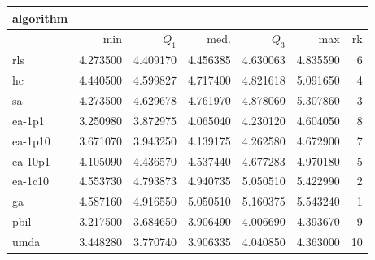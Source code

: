 \begin{tabular}{@{}l*{5}{>{{}}N{1}{2}}>{{}}N{2}{0}@{}}
\toprule
{algorithm} &  \\
\midrule
& {min} & {$Q_1$} & {med.} & {$Q_3$} & {max} & {rk}\\
\midrule
rls & 4.273500 & 4.409170 & 4.456385 & 4.630063 & 4.835590 & 6\\
hc & 4.440500 & 4.599827 & 4.717400 & 4.821618 & 5.091650 & 4\\
sa & 4.273500 & 4.629678 & 4.761970 & 4.878060 & 5.307860 & 3\\
ea-1p1 & 3.250980 & 3.872975 & 4.065040 & 4.230120 & 4.604050 & 8\\
ea-1p10 & 3.671070 & 3.943250 & 4.139175 & 4.262580 & 4.672900 & 7\\
ea-10p1 & 4.105090 & 4.436570 & 4.537440 & 4.677283 & 4.970180 & 5\\
ea-1c10 & 4.553730 & 4.793873 & 4.940735 & 5.050510 & 5.422990 & 2\\
ga & {\color{blue}} 4.587160 & {\color{blue}} 4.916550 & {\color{blue}} 5.050510 & {\color{blue}} 5.160375 & {\color{blue}} 5.543240 & 1\\
pbil & 3.217500 & 3.684650 & 3.906490 & 4.006690 & 4.393670 & 9\\
umda & 3.448280 & 3.770740 & 3.906335 & 4.040850 & 4.363000 & 10\\
\bottomrule
\end{tabular}
